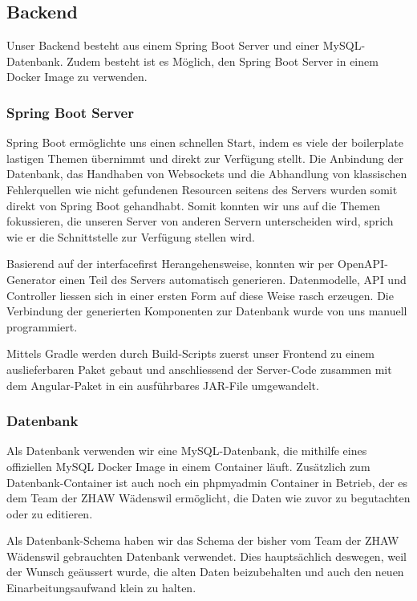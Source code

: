 \documentclass[../main.tex]{subfiles}
\begin{document}
	
	\subsection{Backend}
	Unser Backend besteht aus einem Spring Boot Server und einer MySQL-Datenbank. Zudem besteht ist es Möglich, den Spring Boot Server in einem Docker Image zu verwenden.
	
	\subsubsection{Spring Boot Server}
	Spring Boot ermöglichte uns einen schnellen Start, indem es viele der \gls{boilerplate} lastigen Themen übernimmt und direkt zur Verfügung stellt. Die Anbindung der Datenbank, das Handhaben von Websockets und die Abhandlung von klassischen Fehlerquellen wie nicht gefundenen Resourcen seitens des Servers wurden somit direkt von Spring Boot gehandhabt. Somit konnten wir uns auf die Themen fokussieren, die unseren Server von anderen Servern unterscheiden wird, sprich wie er die Schnittstelle zur Verfügung stellen wird.
	
	\noindent Basierend auf der \gls{interfacefirst} Herangehensweise, konnten wir per OpenAPI-Generator einen Teil des Servers automatisch generieren. Datenmodelle, API und Controller liessen sich in einer ersten Form auf diese Weise rasch erzeugen. Die Verbindung der generierten Komponenten zur Datenbank wurde von uns manuell programmiert.
	
	\noindent Mittels Gradle werden durch Build-Scripts zuerst unser Frontend zu einem auslieferbaren Paket gebaut und anschliessend der Server-Code zusammen mit dem Angular-Paket in ein ausführbares JAR-File umgewandelt.
	
	\subsubsection{Datenbank}
	Als Datenbank verwenden wir eine MySQL-Datenbank, die mithilfe eines offiziellen MySQL Docker Image in einem Container läuft. Zusätzlich zum Datenbank-Container ist auch noch ein \gls{phpmyadmin} Container in Betrieb, der es dem Team der ZHAW Wädenswil ermöglicht, die Daten wie zuvor zu begutachten oder zu editieren.
	
	\noindent Als Datenbank-Schema haben wir das Schema der bisher vom Team der ZHAW Wädenswil gebrauchten Datenbank verwendet. Dies hauptsächlich deswegen, weil der Wunsch geäussert wurde, die alten Daten beizubehalten und auch den neuen Einarbeitungsaufwand klein zu halten.
	
\end{document}
